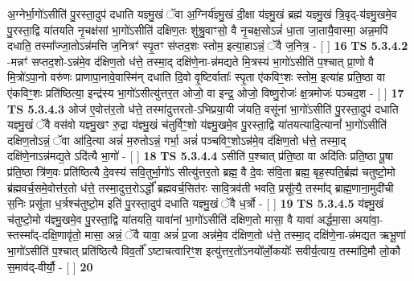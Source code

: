 \documentclass[17pt]{extarticle}
\begin{document}
                  अ॒ग्नेर्भा॒गो॑ऽसीति॑ पु॒रस्ता॒दुप॑ दधाति यज्ञ्मु॒खं ॅवा अ॒ग्निर्य॑ज्ञ्मु॒खं दी॒क्षा य॑ज्ञ्मु॒खं ब्रह्म॑ यज्ञ्मु॒खं त्रि॒वृद्-य॑ज्ञ्मु॒खमे॒व पु॒रस्ता॒द्वि या॑तयति नृ॒चक्ष॑सां भा॒गो॑ऽसीति॑ दक्षिण॒तः शु॑श्रु॒वाꣳसो॒ वै नृ॒चक्ष॒सोऽन्नं॑ धा॒ता जा॒तायै॒वास्मा॒ अन्न॒मपि॑ दधाति॒ तस्मा᳚ज्जा॒तोऽन्न॑मत्ति ज॒नित्रꣳ॑ स्पृ॒तꣳ स॑प्तद॒शः स्तोम॒ इत्या॒हाऽन्नं॒ ॅवै ज॒नित्र॒ - [  ] \textbf{  16} \newline
                  \newline
                                \textbf{ TS 5.3.4.2} \newline
                  -मन्नꣳ॑ सप्तद॒शो-ऽन्न॑मे॒व द॑क्षिण॒तो ध॑त्ते॒ तस्मा॒द् दक्षि॑णे॒ना-न्न॑मद्यते मि॒त्रस्य॑ भा॒गो॑ऽसीति॑ प॒श्चात् प्रा॒णो वै मि॒त्रो॑ऽपा॒नो वरु॑णः प्राणापा॒नावे॒वास्मि॑न् दधाति दि॒वो वृ॒ष्टिर्वाताः᳚ स्पृ॒ता ए॑कविꣳ॒॒शः स्तोम॒ इत्या॑ह प्रति॒ष्ठा वा ए॑कविꣳ॒॒शः प्रति॑ष्ठित्या॒ इन्द्र॑स्य भा॒गो॑ऽसीत्यु॑त्तर॒त ओजो॒ वा इन्द्र॒ ओजो॒ विष्णु॒रोजः॑ क्ष॒त्रमोजः॑ पञ्चद॒श - [  ] \textbf{  17} \newline
                  \newline
                                \textbf{ TS 5.3.4.3} \newline
                  ओज॑ ए॒वोत्त॑र॒तो ध॑त्ते॒ तस्मा॑दुत्तरतो-ऽभिप्रया॒यी ज॑यति॒ वसू॑नां भा॒गो॑ऽसीति॑ पु॒रस्ता॒दुप॑ दधाति यज्ञ्मु॒खं ॅवै वस॑वो यज्ञ्मु॒खꣳ रु॒द्रा य॑ज्ञ्मु॒खं च॑तुर्विꣳ॒॒शो य॑ज्ञ्मु॒खमे॒व पु॒रस्ता॒द्वि या॑तयत्यादि॒त्यानां᳚ भा॒गो॑ऽसीति॑ दक्षिण॒तोऽन्नं॒ ॅवा आ॑दि॒त्या अन्नं॑ म॒रुतोऽन्नं॒ गर्भा॒ अन्नं॑ पञ्चविꣳ॒॒शोऽन्न॑मे॒व द॑क्षिण॒तो ध॑त्ते॒ तस्मा॒द् दक्षि॑णे॒नाऽन्न॑मद्य॒ते ऽदि॑त्यै भा॒गो॑ - [  ] \textbf{  18} \newline
                  \newline
                                \textbf{ TS 5.3.4.4} \newline
                  ऽसीति॑ प॒श्चात् प्र॑ति॒ष्ठा वा अदि॑तिः प्रति॒ष्ठा पू॒षा प्र॑ति॒ष्ठा त्रि॑ण॒वः प्रति॑ष्ठित्यै दे॒वस्य॑ सवि॒तुर्भा॒गो॑ऽ सीत्यु॑त्तर॒तो ब्रह्म॒ वै दे॒वः स॑वि॒ता ब्रह्म॒ बृह॒स्पति॒र्ब्रह्म॑ चतुष्टो॒मो ब्र॑ह्मवर्च॒समे॒वोत्त॑र॒तो ध॑त्ते॒ तस्मा॒दुत्त॒रोऽर्द्धो᳚ ब्रह्मवर्च॒सित॑रः सावि॒त्रव॑ती भवति॒ प्रसू᳚त्यै॒ तस्मा᳚द् ब्राह्म॒णाना॒मुदी॑ची स॒निः प्रसू॑ता ध॒र्त्रश्च॑तुष्टो॒म इति॑ पु॒रस्ता॒दुप॑ दधाति यज्ञ्मु॒खं ॅवै ध॒र्त्रो - [  ] \textbf{  19} \newline
                  \newline
                                \textbf{ TS 5.3.4.5} \newline
                  य॑ज्ञ्मु॒खं च॑तुष्टो॒मो य॑ज्ञ्मु॒खमे॒व पु॒रस्ता॒द्वि या॑तयति॒ यावा॑नां भा॒गो॑ऽसीति॑ दक्षिण॒तो मासा॒ वै यावा॑ अर्द्धमा॒सा अया॑वा॒-स्तस्मा᳚द्-दक्षि॒णावृ॑तो॒ मासा॒ अन्नं॒ ॅवै यावा॒ अन्नं॑ प्र॒जा अन्न॑मे॒व द॑क्षिण॒तो ध॑त्ते॒ तस्मा॒द् दक्षि॑णे॒ना-न्न॑मद्यत ऋभू॒णां भा॒गो॑ऽसीति॑ प॒श्चात् प्रति॑ष्ठित्यै विव॒र्तो᳚ ऽष्टाचत्वारिꣳ॒॒श इत्यु॑त्तर॒तो॑ऽनयो᳚र्लो॒कयोः᳚ सवीर्य॒त्वाय॒ तस्मा॑दि॒मौ लो॒कौ स॒माव॑द्-वीर्यौ॒ - [  ] \textbf{  20} \newline
\end{document}
